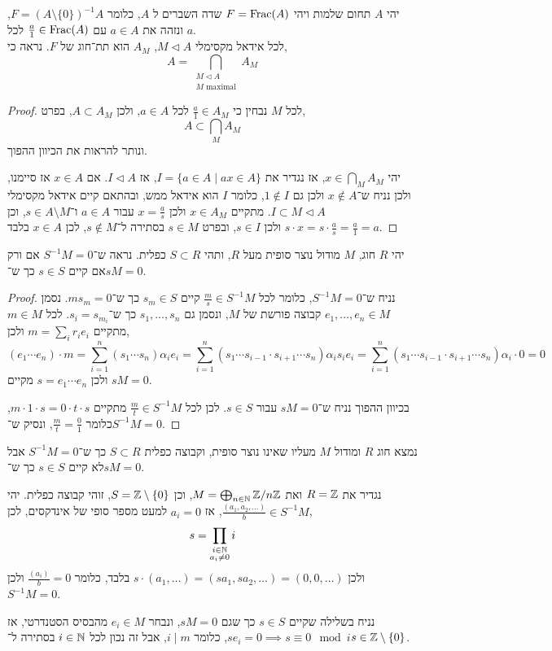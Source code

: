 \question{}
יהי $A$ תחום שלמות ויהי $F = \operatorname{Frac}(A)$ שדה השברים ל $A$, כלומר $F = {(A \setminus \{ 0 \})}^{-1} A$, ונזהה את $a \in A$ עם $\frac{a}{1} \in \operatorname{Frac}(A)$ לכל $a$. \\
לכל אידאל מקסימלי $M \triangleleft A$, $A_M$ הוא תת־חוג של $F$.
נראה כי,
\[
	A
	= \bigcap_{\substack{M \triangleleft A \\ M \text{ maximal}}} A_M
\]
\begin{proof}
	לכל $M$ נבחין כי $\frac{a}{1} \in A_M$ לכל $a \in A$, ולכן $A \subset A_M$, בפרט,
	\[
		A
		\subset \bigcap_M A_M
	\]
	ונותר להראות את הכיוון ההפוך.

	יהי $x \in \bigcap_M A_M$, אז נגדיר את $I = \{ a \in A \mid a x \in A \}$, אז $I \triangleleft A$.
	אם $x \in A$ אז סיימנו, ולכן נניח ש־$x \notin A$ ולכן גם $1 \notin I$, כלומר $I$ הוא אידאל ממש, ובהתאם קיים אידאל מקסימלי $I \subset M \triangleleft A$.
	מתקיים $x \in A_M$ ולכן $x = \frac{a}{s}$ עבור $a \in A$ ו־$s \in A \setminus M$, וכן $s \cdot x = s \cdot \frac{a}{s} = \frac{a}{1} = a$ ולכן $s \in I$, ובפרט $s \in M$ בסתירה ל־$s \notin M$, לכן $x \in A$ בלבד.
\end{proof}

\question{}
\subquestion{}
יהי $R$ חוג, $M$ מודול נוצר סופית מעל $R$, ותהי $S \subset R$ כפלית.
נראה ש־$S^{-1} M = 0$ אם ורק אם קיים $s \in S$ כך ש־$s M = 0$.
\begin{proof}
	נניח ש־$S^{-1} M = 0$, כלומר לכל $\frac{m}{s} \in S^{-1} M$ קיים $s_m \in S$ כך ש־$m s_m = 0$.
	נסמן $e_1, \ldots, e_n \in M$ קבוצה פורשת של $M$, ונסמן גם $s_1, \ldots, s_n$ כך ש־$s_i = s_{m_i}$.
	לכל $m \in M$ מתקיים $m = \sum_i r_i e_i$ ולכן,
	\[
		(e_1 \cdots e_n) \cdot m
		= \sum_{i = 1}^n (s_1 \cdots s_n) \alpha_i e_i
		= \sum_{i = 1}^n (s_1 \cdots s_{i - 1} \cdot s_{i + 1} \cdots s_n) \alpha_i s_i e_i
		= \sum_{i = 1}^n (s_1 \cdots s_{i - 1} \cdot s_{i + 1} \cdots s_n) \alpha_i \cdot 0
		= 0
	\]
	ולכן $s = e_1 \cdots e_n$ מקיים $s M = 0$.

	בכיוון ההפוך נניח ש־$s M = 0$ עבור $s \in S$.
	לכן לכל $\frac{m}{t} \in S^{-1} M$ מתקיים $m \cdot 1 \cdot s = 0 \cdot t \cdot s$, כלומר $\frac{m}{t} = \frac{0}{1}$, ונסיק ש־$S^{-1} M = 0$.
\end{proof}

\subquestion{}
נמצא חוג $R$ ומודול $M$ מעליו שאינו נוצר סופית, וקבוצה כפלית $S \subset R$ כך ש־$S^{-1} M = 0$ אבל לא קיים $s \in S$ כך ש־$s M = 0$.
\begin{solution}
	נגדיר את $R = \mathbb{Z}$ ואת $M = \bigoplus_{n \in \mathbb{N}} \mathbb{Z} / n \mathbb{Z}$, וכן $S = \mathbb{Z} \setminus \{ 0 \}$, זוהי קבוצה כפלית.
	יהי $\frac{(a_1, a_2, \ldots)}{b} \in S^{-1} M$, אז $a_i = 0$ למעט מספר סופי של אינדקסים, לכן,
	\[
		s
		= \prod_{\substack{i \in \mathbb{N} \\ a_i \ne 0}} i
	\]
	ולכן $s \cdot (a_1, \ldots) = (s a_1, s a_2, \ldots) = (0, 0, \ldots)$ בלבד, כלומר $\frac{(a_i)}{b} = 0$ ולכן $S^{-1} M = 0$.

	נניח בשלילה שקיים $s \in S$ כך שגם $s M = 0$, ונבחר $e_i \in M$ מהבסיס הסטנדרטי, אז $s e_i = 0 \implies s \equiv 0 \mod i$, כלומר $i \mid m$, אבל זה נכון לכל $i \in \mathbb{N}$ בסתירה ל־$s \in \mathbb{Z} \setminus \{ 0 \}$.
\end{solution}

